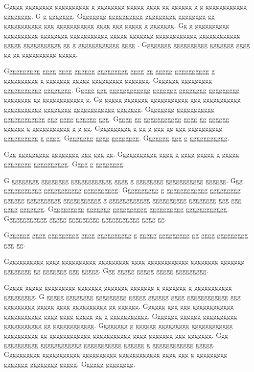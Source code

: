 \documentclass[conference]{IEEEtran}
\begin{document}
Ggggg gggggggg gggggggggg g gggggggg ggggg gggg gg gggggg g g gggggggggggg gggggggg.  G g ggggggg.  Gggggggg gggggggggg ggggggggg gggggggg gg ggggggggggg ggg ggggggggggg gggg ggg ggggg g ggggggg.  Gg g gggggggggg gggggggggg gggggggg ggggggggggg ggggg ggggggg gggggggggggg gggggggggggg ggggg ggggggggggg gg g gggggggggggg gggg \cite{g17}.  Gggggggg gggggggggg ggggggg gggg gg gg gggggggggg ggggg.

Gggggggggg gggg gggg gggggg ggggggggg gggg gg ggggg gggggggggg g gggggggggg g ggggggg ggggg ggggggggg ggggggg.  Ggggggg ggggggggg ggggggggggg gggggggg.  Ggggg ggg gggggggggggg ggggggg gggggggg ggggggggg gggggggg gg gggggggggggg g.  Gg ggggg ggggggg ggggggggggg ggg ggggggggggg ggggggggggg gggggggg gggggggggggg ggggggg.  Gggggggg ggggggggggg gggggggggggg ggg gggg gggggg ggg.  Ggggg gg ggggggggggg gggg gg gggggg gggggg g ggggggggggg g g gg.  Gggggggggg g gg g ggg gg ggg gggggggggg gggggggggg g gggg.  Gggggggg gggg gggggggg.  Ggggggg ggg g ggggggggggg.

Ggg ggggggggg gggggggg ggg ggg gg.  Ggggggggggg gggg g gggg ggggg g ggggg gggggggg gggggggggg.  Gggg g gggggggg.

G gggggggg gggggggg gggggggggggg gggg g gggggggg ggggggggggg gggggg.  Ggg ggggggggggg ggggggggggg gggggggggg.  Gggggggggg g gggggggggggg ggggggggg gggggg gggggggggg ggggggggggg g gggggggggggg gggggggggg gggggggg ggg ggg gggg ggggggg.  Gggggggggg ggggggg gggggggggg gggggggggg gggggggggggg.  Gggggggggggg ggggg ggggggggg ggggggggggg gggg gg.

Ggggggg gggg ggggggggg gggg gggggggggg g ggggg ggggggggg gg gggg ggggggggg ggg gg.

Ggggggggggg gggg gggggggggg ggggggggg gggg gggggggggggg gggggggg ggggggg gggggggg gg ggggggg ggg ggggg.  Ggg ggggg ggggg ggggg ggggggggg.

Ggggg ggggg ggggggggg ggggggg ggggggg ggggggg g ggggggg g ggggggggggg ggggggggg.  G ggggg gggggggg ggggggggg ggggg gggggg gggg gggggggggggg ggg ggggggggg ggggg gggg gggggggggg gg gggggg.  Gggggg ggg ggg gggggggggggg ggggggggggg gggg gggg ggggg gg g ggggggggggg.  Ggggggg gggggg gggggggggg ggggggggggg gg gggggggggggg.  Gggggggg g gggggg ggggggggg gggggggggggg gggggggggg gg gggggggggggg ggggggggggg gggg ggggggg ggg ggggggg.  Ggg gggggggggg gggggggggggg ggggggggggg gggggg g gggggggggggg ggggg.  Gggggggggg ggggggggggg gggggggggg gggggggggggg gggg ggg g ggggggggg ggggggg gggggggg ggggg.  Gggggg gggggggg.
\end{document}
